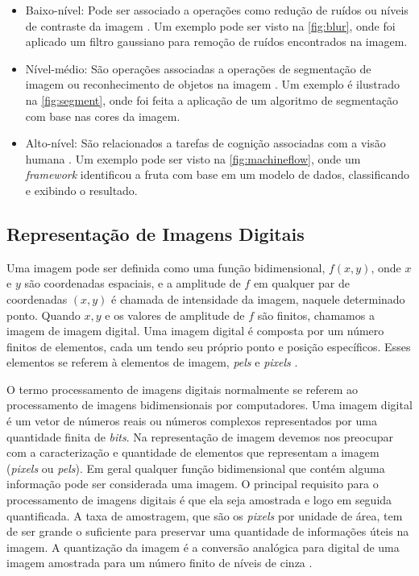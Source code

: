 \begin{itemize}
\item Baixo-nível: 
	Pode ser associado a operações como redução de ruídos ou níveis de contraste da imagem \cite{marengoni:2009}. Um exemplo pode ser visto na \autoref{fig:blur}, onde foi aplicado um filtro gaussiano para remoção de ruídos encontrados na imagem. 

\item Nível-médio:
	São operações associadas a operações de segmentação de imagem ou reconhecimento de objetos na imagem \cite{marengoni:2009}. Um exemplo é ilustrado na \autoref{fig:segment}, onde foi feita a aplicação de um algoritmo de segmentação com base nas cores da imagem.
	
\item Alto-nível:
São relacionados a tarefas de cognição associadas com a visão humana \cite{marengoni:2009}. Um exemplo pode ser visto na \autoref{fig:machineflow}, onde um \textit{framework} identificou a fruta com base em um modelo de dados, classificando e exibindo o resultado.

	
\end{itemize} 




\subsection{Representação de Imagens Digitais}
Uma imagem pode ser definida como uma função bidimensional, $f(x,y)$, onde $x$ e $y$ são coordenadas espaciais, e a amplitude de $f$ em qualquer par de coordenadas $(x,y)$ é chamada de intensidade da imagem, naquele determinado ponto. Quando $x,y$ e os valores de amplitude de $f$ são finitos, chamamos a imagem de imagem digital. Uma imagem digital é composta por um número finitos de elementos, cada um tendo seu próprio ponto e posição específicos. Esses elementos se referem à elementos de imagem, \textit{pels} e \textit{pixels} \cite{gonzalez1992digital}. 

O termo processamento de imagens digitais normalmente se referem ao processamento de imagens bidimensionais por computadores. Uma imagem digital é um vetor de números reais ou números complexos representados por uma quantidade finita de \textit{bits}.
Na representação de imagem devemos nos preocupar com a caracterização e quantidade de elementos que representam a imagem (\textit{pixels} ou \textit{pels}). Em geral qualquer função bidimensional que contém alguma informação pode ser considerada uma imagem. O principal requisito para o processamento de imagens digitais é que ela seja amostrada e logo em seguida quantificada. A taxa de amostragem, que são os \textit{pixels} por unidade de área, tem de ser grande o suficiente para preservar uma quantidade de informações úteis na imagem. A quantização da imagem é a conversão analógica para digital de uma imagem amostrada para um número finito de níveis de cinza \cite{jain1989fundamentals}.

